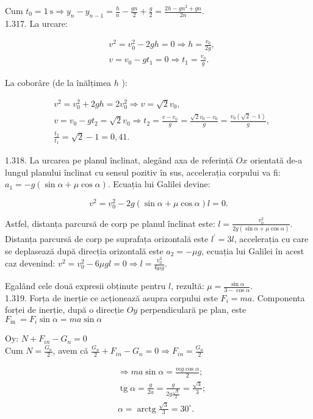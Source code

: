 Cum $t_{0}=1 \mathrm{~s} \Rightarrow y_{n}-y_{n-1}=\frac{h}{n}-\frac{g n}{2}+\frac{g}{2}=\frac{2 h-g n^{2}+g n}{2 n}$.\\
1.317. La urcare:

$$
\begin{aligned}
& v^{2}=v_{0}^{2}-2 g h=0 \Rightarrow h=\frac{v_{0}}{2 g}, \\
& v=v_{0}-g t_{1}=0 \Rightarrow t_{1}=\frac{v_{0}}{g} .
\end{aligned}
$$

La coborâre (de la înălțimea $h$ ):

$$
\begin{aligned}
& v^{2}=v_{0}^{2}+2 g h=2 v_{0}^{2} \Rightarrow v=\sqrt{2} v_{0}, \\
& v=v_{0}-g t_{2}=\sqrt{2} v_{0} \Rightarrow t_{2}=\frac{v-v_{0}}{g}=\frac{\sqrt{2} v_{0}-v_{0}}{g}=\frac{v_{0}(\sqrt{2}-1)}{g}, \\
& \frac{t_{2}}{t_{1}}=\sqrt{2}-1=0,41 .
\end{aligned}
$$

1.318. La urcarea pe planul înclinat, alegând axa de referință $O x$ orientată de-a lungul planului înclinat cu sensul pozitiv în sus, accelerația corpului va fi: $a_{1}=-g(\sin \alpha+\mu \cos \alpha)$. Ecuația lui Galilei devine:

$$
v^{2}=v_{0}^{2}-2 g(\sin \alpha+\mu \cos \alpha) l=0 .
$$

Astfel, distanța parcursă de corp pe planul înclinat este: $l=\frac{v_{0}^{2}}{2 g(\sin \alpha+\mu \cos \alpha)}$.\\
Distanța parcursă de corp pe suprafața orizontală este $l^{\prime}=3 l$, accelerația cu care se deplasează după direcția orizontală este $a_{2}=-\mu g$, ecuația lui Galilei în acest caz devenind: $v^{2}=v_{0}^{2}-6 \mu g l=0 \Rightarrow l=\frac{v_{0}^{2}}{6 \mu g}$.

Egalând cele două expresii obținute pentru $l$, rezultă: $\mu=\frac{\sin \alpha}{3-\cos \alpha}$.\\
1.319. Forța de inerție ce acționează asupra corpului este $F_{i}=m a$. Componenta forței de inerție, după o direcție $O y$ perpendiculară pe plan, este $F_{\text {in }}=F_{i} \sin \alpha=m a \sin \alpha$

Oy: $N+F_{i n}-G_{n}=0$\\
Cum $N=\frac{G_{n}}{2}$, avem că $\frac{G_{n}}{2}+F_{i n}-G_{n}=0 \Rightarrow F_{i n}=\frac{G_{n}}{2}$

$$
\begin{aligned}
& \Rightarrow m a \sin \alpha=\frac{m g \cos \alpha}{2} ; \\
& \operatorname{tg} \alpha=\frac{g}{2 a}=\frac{g}{2 g \frac{\sqrt{3}}{2}}=\frac{\sqrt{3}}{3} ; \\
& \alpha=\operatorname{arctg} \frac{\sqrt{3}}{3}=30^{\circ} .
\end{aligned}
$$


